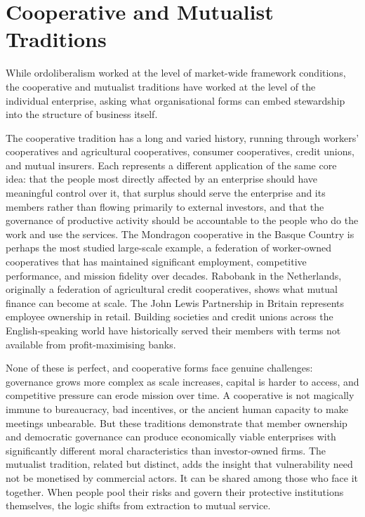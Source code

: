 \documentclass[11pt,a4paper,oneside]{book}
\begin{document}
\section*{Cooperative and Mutualist Traditions}

While ordoliberalism worked at the level of market-wide framework conditions, the cooperative and mutualist traditions have worked at the level of the individual enterprise, asking what organisational forms can embed stewardship into the structure of business itself.

The cooperative tradition has a long and varied history, running through workers' cooperatives and agricultural cooperatives, consumer cooperatives, credit unions, and mutual insurers. Each represents a different application of the same core idea: that the people most directly affected by an enterprise should have meaningful control over it, that surplus should serve the enterprise and its members rather than flowing primarily to external investors, and that the governance of productive activity should be accountable to the people who do the work and use the services. The Mondragon cooperative in the Basque Country is perhaps the most studied large-scale example, a federation of worker-owned cooperatives that has maintained significant employment, competitive performance, and mission fidelity over decades. Rabobank in the Netherlands, originally a federation of agricultural credit cooperatives, shows what mutual finance can become at scale. The John Lewis Partnership in Britain represents employee ownership in retail. Building societies and credit unions across the English-speaking world have historically served their members with terms not available from profit-maximising banks.

None of these is perfect, and cooperative forms face genuine challenges: governance grows more complex as scale increases, capital is harder to access, and competitive pressure can erode mission over time. A cooperative is not magically immune to bureaucracy, bad incentives, or the ancient human capacity to make meetings unbearable. But these traditions demonstrate that member ownership and democratic governance can produce economically viable enterprises with significantly different moral characteristics than investor-owned firms. The mutualist tradition, related but distinct, adds the insight that vulnerability need not be monetised by commercial actors. It can be shared among those who face it together. When people pool their risks and govern their protective institutions themselves, the logic shifts from extraction to mutual service.
\end{document}
